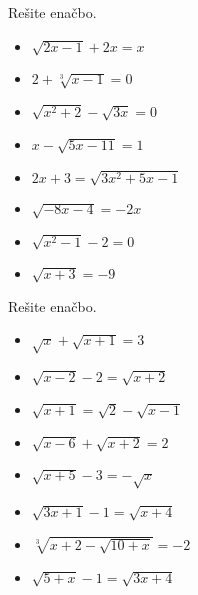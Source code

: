         
            \begin{naloga}
                Rešite enačbo.
                \begin{multicols}{2}
                    \begin{itemize}
                        \item $\displaystyle \sqrt{2x-1}+2x=x$ 
                        \item $\displaystyle 2+\sqrt[3]{x-1}=0$ 
                        \item $\displaystyle \sqrt{x^2+2}-\sqrt{3x}=0$ 
                        \item $\displaystyle x-\sqrt{5x-11}=1$ 
                        \item $\displaystyle 2x+3=\sqrt{3x^2+5x-1}$ 
                        \item $\displaystyle \sqrt{-8x-4}=-2x$ 
                        \item $\displaystyle \sqrt{x^2-1}-2=0$ 
                        \item $\displaystyle \sqrt{x+3}=-9$ 
                    \end{itemize}
                \end{multicols}
            \end{naloga}

        
            \begin{naloga}
                Rešite enačbo.
                \begin{multicols}{2}
                    \begin{itemize}
                        \item $\displaystyle \sqrt{x}+\sqrt{x+1}=3$ 
                        \item $\displaystyle \sqrt{x-2}-2=\sqrt{x+2}$ 
                        \item $\displaystyle \sqrt{x+1}=\sqrt{2}-\sqrt{x-1}$ 
                        \item $\displaystyle \sqrt{x-6}+\sqrt{x+2}=2$ 
                        \item $\displaystyle \sqrt{x+5}-3=-\sqrt{x}$ 
                        \item $\displaystyle \sqrt{3x+1}-1=\sqrt{x+4}$ 
                        \item $\displaystyle \sqrt[3]{x+2-\sqrt{10+x}}=-2$ 
                        \item $\displaystyle \sqrt{5+x}-1=\sqrt{3x+4}$ 
                    \end{itemize}
                \end{multicols}
            \end{naloga}

